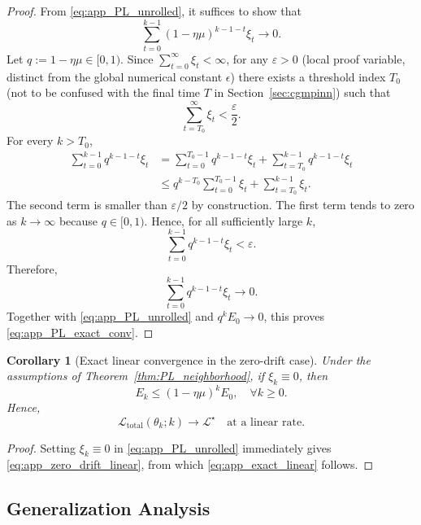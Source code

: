 \documentclass{article}
\theoremstyle{plain}
\newtheorem{corollary}[theorem]{Corollary}
\theoremstyle{definition}
\theoremstyle{remark}
\begin{document}
\begin{proof}
	From \eqref{eq:app_PL_unrolled}, it suffices to show that
	\[
	\sum_{t=0}^{k-1}(1-\eta\mu)^{k-1-t}\xi_t\to 0.
	\]
	Let $q:=1-\eta\mu\in[0,1)$.
	Since $\sum_{t=0}^{\infty}\xi_t<\infty$, for any $\varepsilon>0$
	(local proof variable, distinct from the global numerical constant
	$\epsilon$) there exists a threshold index $T_0$ (not to be confused
	with the final time $T$ in Section~\ref{sec:cgmpinn}) such that
	\[
	\sum_{t=T_0}^{\infty}\xi_t<\frac{\varepsilon}{2}.
	\]
	For every $k>T_0$,
	\begin{align}
		\sum_{t=0}^{k-1}q^{k-1-t}\xi_t
		&=
		\sum_{t=0}^{T_0-1}q^{k-1-t}\xi_t
		+
		\sum_{t=T_0}^{k-1}q^{k-1-t}\xi_t
		\nonumber\\
		&\leqslant
		q^{k-T_0}\sum_{t=0}^{T_0-1}\xi_t
		+
		\sum_{t=T_0}^{k-1}\xi_t.
		\label{eq:app_tail_split}
	\end{align}
	The second term is smaller than $\varepsilon/2$ by construction.
	The first term tends to zero as $k\to\infty$ because $q\in[0,1)$.
	Hence, for all sufficiently large $k$,
	\[
	\sum_{t=0}^{k-1}q^{k-1-t}\xi_t<\varepsilon.
	\]
	Therefore,
	\[
	\sum_{t=0}^{k-1}q^{k-1-t}\xi_t\to 0.
	\]
	Together with \eqref{eq:app_PL_unrolled} and $q^kE_0\to 0$, this proves
	\eqref{eq:app_PL_exact_conv}.
\end{proof}

\begin{corollary}[Exact linear convergence in the zero-drift case]
	\label{cor:zero_drift_linear}
	Under the assumptions of Theorem~\ref{thm:PL_neighborhood}, if
	$\xi_k\equiv 0$, then
	\begin{equation}
		E_k\leqslant (1-\eta\mu)^kE_0,
		\quad \forall k\geqslant 0.
		\label{eq:app_zero_drift_linear}
	\end{equation}
	Hence,
	\begin{equation}
		\mathcal{L}_{\mathrm{total}}(\theta_k;k)\to \mathcal{L}^{\star}
		\quad\text{at a linear rate.}
		\label{eq:app_exact_linear}
	\end{equation}
\end{corollary}

\begin{proof}
	Setting $\xi_k\equiv 0$ in \eqref{eq:app_PL_unrolled} immediately gives
	\eqref{eq:app_zero_drift_linear}, from which
	\eqref{eq:app_exact_linear} follows.
\end{proof}

\subsection{Generalization Analysis}
\label{app:generalization}
\end{document}
